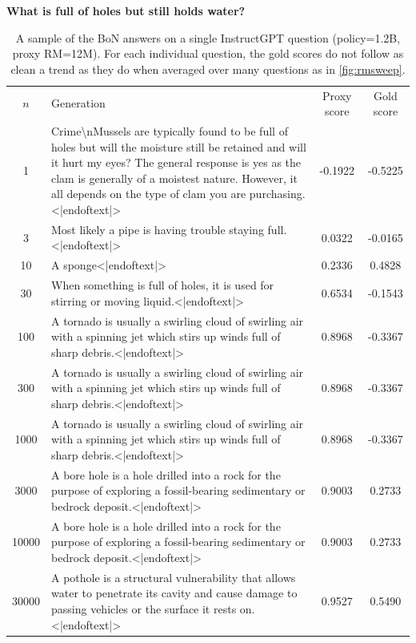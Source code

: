 \documentclass{article}
\theoremstyle{plain}
\begin{document}
\begin{table}[]
    \centering
    \textbf{What is full of holes but still holds water?} \\
    \begin{tabular}{c|p{5cm}|c|c}
        $n$ & Generation & Proxy score & Gold score \\
        1 & Crime{\textbackslash{}n}Mussels are typically found to be full of holes but will the moisture still be retained and will it hurt my eyes? The general response is yes as the clam is generally of a moistest nature. However, it all depends on the type of clam you are purchasing.\textless{}|endoftext|\textgreater{}& -0.1922 & -0.5225\\
        3 & Most likely a pipe is having trouble staying full.\textless{}|endoftext|\textgreater{} & 0.0322 & -0.0165\\
        {10} & {A sponge\textless{}|endoftext|\textgreater{}} & {0.2336} & {0.4828} \\
        30 & When something is full of holes, it is used for stirring or moving liquid.\textless{}|endoftext|\textgreater{} & 0.6534 & -0.1543\\
        100 & A tornado is usually a swirling cloud of swirling air with a spinning jet which stirs up winds full of sharp debris.\textless{}|endoftext|\textgreater{} & 0.8968 & -0.3367\\
        300 & A tornado is usually a swirling cloud of swirling air with a spinning jet which stirs up winds full of sharp debris.\textless{}|endoftext|\textgreater{} & 0.8968 & -0.3367\\
        1000 & A tornado is usually a swirling cloud of swirling air with a spinning jet which stirs up winds full of sharp debris.\textless{}|endoftext|\textgreater{} & 0.8968 & -0.3367\\
        3000 & A bore hole is a hole drilled into a rock for the purpose of exploring a fossil-bearing sedimentary or bedrock deposit.\textless{}|endoftext|\textgreater{} & 0.9003 & 0.2733\\
        10000 & A bore hole is a hole drilled into a rock for the purpose of exploring a fossil-bearing sedimentary or bedrock deposit.\textless{}|endoftext|\textgreater{} & 0.9003 & 0.2733\\
        30000 & A pothole is a structural vulnerability that allows water to penetrate its cavity and cause damage to passing vehicles or the surface it rests on.\textless{}|endoftext|\textgreater{} & 0.9527 & 0.5490\\
        
    \end{tabular}
    \caption{A sample of the BoN answers on a single InstructGPT question (policy=1.2B, proxy RM=12M). For each individual question, the gold scores do not follow as clean a trend as they do when averaged over many questions as in \cref{fig:rmsweep}.}
    \label{tab:my_label}
\end{table}
\end{document}
